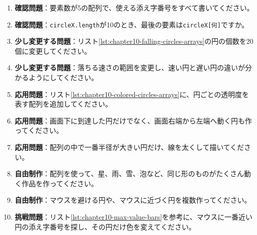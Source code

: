 \begin{enumerate}
    \item \textbf{確認問題}：要素数が5の配列で、使える添え字番号をすべて書いてください。
    \item \textbf{確認問題}：\texttt{circleX.length}が10のとき、最後の要素は\texttt{circleX[何]}ですか。
    \item \textbf{少し変更する問題}：リスト\ref{lst:chapter10-falling-circles-arrays}の円の個数を20個に変更してください。
    \item \textbf{少し変更する問題}：落ちる速さの範囲を変更し、速い円と遅い円の違いが分かるようにしてください。
    \item \textbf{応用問題}：リスト\ref{lst:chapter10-colored-circles-arrays}に、円ごとの透明度を表す配列を追加してください。
    \item \textbf{応用問題}：画面下に到達した円だけでなく、画面右端から左端へ動く円も作ってください。
    \item \textbf{応用問題}：配列の中で一番半径が大きい円だけ、線を太くして描いてください。
    \item \textbf{自由制作}：配列を使って、星、雨、雪、泡など、同じ形のものがたくさん動く作品を作ってください。
    \item \textbf{自由制作}：マウスを避ける円や、マウスに近づく円を複数作ってください。
    \item \textbf{挑戦問題}：リスト\ref{lst:chapter10-max-value-bars}を参考に、マウスに一番近い円の添え字番号を探し、その円だけ色を変えてください。
\end{enumerate}
